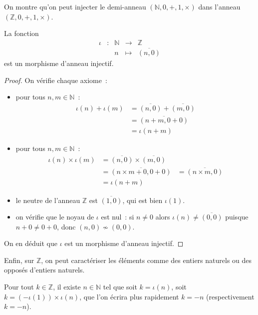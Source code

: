 On montre qu'on peut injecter le demi-anneau $(\mathbb N,0,+,1,\times)$ dans
l'anneau $(\mathbb Z,0,+,1,\times)$.

\begin{proposition}
  La fonction
  \[\begin{array}{ccccc}
  \iota & : & \mathbb N & \longrightarrow & \mathbb Z\\
  & & n & \longmapsto & \overline{(n,0)}
  \end{array}\]
  est un morphisme d'anneau injectif.
\end{proposition}

\begin{proof}
  On vérifie chaque axiome~:
  \begin{itemize}
  \item pour tous $n,m\in\mathbb N$~:
    \begin{align*}
      \iota(n) + \iota(m) &= \overline{(n,0)} + \overline{(m,0)}\\
      &= \overline{(n+m,0+0)}\\
      &= \iota(n+m)
    \end{align*}
  \item pour tous $n,m\in\mathbb N$~:
    \begin{align*}
      \iota(n)\times \iota(m) &= \overline{(n,0)} \times \overline{(m,0)}\\
      &= \overline{(n \times m + 0, 0 + 0)}
      &= \overline{(n\times m,0)}\\
      &= \iota(n+m)
    \end{align*}
  \item le neutre de l'anneau $\mathbb Z$ est $\overline{(1,0)}$, qui est bien
    $\iota(1)$.
  \item on vérifie que le noyau de $\iota$ est nul~: si $n\neq 0$ alors
    $\iota(n) \neq \overline{(0,0)}$ puisque $n + 0 \neq 0 + 0$, donc
    $(n,0)\nsim (0,0)$.
  \end{itemize}
  On en déduit que $\iota$ est un morphisme d'anneau injectif.
\end{proof}

Enfin, sur $\mathbb Z$, on peut caractériser les éléments comme des entiers
naturels ou des opposés d'entiers naturels.

\begin{proposition}
  Pour tout $k \in \mathbb Z$, il existe $n \in \mathbb N$ tel que soit
  $k = \iota(n)$, soit $k = (-\iota(1)) \times \iota(n)$, que l'on écrira
  plus rapidement $k = -n$ (respectivement $k = -n$).
\end{proposition}

